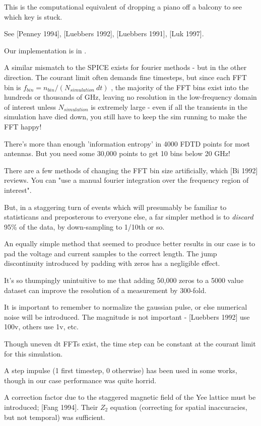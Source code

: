 \documentclass[paper.tex]{subfiles}
\begin{document}
This is the computational equivalent of dropping a piano off a balcony to see which key is stuck.

See [Penney 1994], [Luebbers 1992], [Luebbers 1991], [Luk 1997]. 

Our implementation is in .

A similar mismatch to the SPICE exists for fourier methods - but in the other direction.  The courant limit often demands fine timesteps, but since each FFT bin is $ f_{bin} = n_{bin} / (N_{simulation} \ dt) $ , the majority of the FFT bins exist into the hundreds or thousands of GHz, leaving no resolution in the low-frequency domain of interest unless $N_{simulation}$ is extremely large - even if all the transients in the simulation have died down, you still have to keep the sim running to make the FFT happy! 

There's more than enough 'information entropy' in 4000 FDTD points for most antennas. But you need some 30,000 points to get 10 bins below 20 GHz!

There are a few methods of changing the FFT bin size artificially, which [Bi 1992] reviews. You can "use a manual fourier integration over the frequency region of interest".

But, in a staggering turn of events which will presumably be familiar to statisticans and preposterous to everyone else, a far simpler method is to {\it discard} 95\% of the data, by down-sampling to 1/10th or so.

An equally simple method that seemed to produce better results in our case is to pad the voltage and current samples to the correct length. The jump discontinuity introduced by padding with zeros has a negligible effect.

It's so thumpingly unintuitive to me that adding 50,000 zeros to a 5000 value dataset can improve the resolution of a measurement by 300-fold.

It is important to remember to normalize the gaussian pulse, or else numerical noise will be introduced. The magnitude is not important - [Luebbers 1992] use 100v, others use 1v, etc.

Though uneven dt FFTs exist, the time step can be constant at the courant limit for this simulation.

A step impulse (1 first timestep, 0 otherwise) has been used in some works, though in our case performance was quite horrid.

A correction factor due to the staggered magnetic field of the Yee lattice must be introduced; [Fang 1994]. Their $Z_2$ equation (correcting for spatial inaccuracies, but not temporal) was sufficient.
\end{document}
